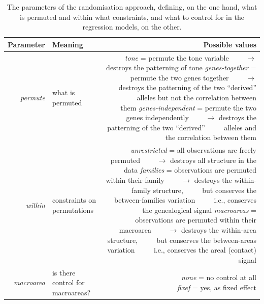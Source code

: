 \documentclass[twoside,onecolumn]{article}
\begin{document}
\begin{table}[h]
  \caption{The parameters of the randomisation approach, defining, on the one hand, what is permuted and within what constraints, and what to control for in the regression models, on the other.}
  \label{Tab:randomization_params}
  \centering
  \begin{tabularx}{\textwidth}{|r|X|r|}
    \toprule
    \textbf{Parameter} & \textbf{Meaning} & \textbf{Possible values} \\
    \midrule
    \textit{permute} & what is permuted & \makecell[l]{\textit{tone} = permute the tone variable\\~~~~$\rightarrow$ destroys the patterning of tone\\
      \textit{genes-together} = permute the two genes together\\~~~~$\rightarrow$ destroys the patterning of the two ``derived''\\~~~~ alleles but not the correlation between them\\
      \textit{genes-independent} = permute the two genes independently\\~~~~$\rightarrow$ destroys the patterning of the two ``derived''\\~~~~ alleles and the correlation between them} \\
    \midrule
    \textit{within} & constraints on permutations & \makecell[l]{\textit{unrestricted} = all observations are freely permuted\\~~~~$\rightarrow$ destroys all structure in the data\\
      \textit{families} = observations are permuted within their family\\~~~~$\rightarrow$ destroys the within-family structure,\\~~~~ but conserves the between-families variation\\~~~~ i.e., conserves the genealogical signal\\
      \textit{macroareas} = observations are permuted within their macroarea\\~~~~$\rightarrow$ destroys the within-area structure,\\~~~~ but conserves the between-areas variation\\~~~~ i.e., conserves the areal (contact) signal} \\
    \midrule
    \textit{macroarea} & is there control for macroareas? & \makecell[l]{\textit{none} = no control at all\\
      \textit{fixef} = yes, as fixed effect} \\
    \bottomrule
  \end{tabularx}
\end{table}
\end{document}
